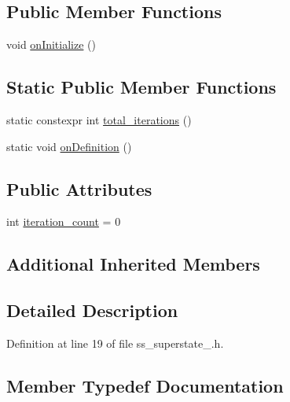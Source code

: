 \subsection*{Public Member Functions}
\begin{DoxyCompactItemize}
\item 
void \hyperlink{structsm__three__some_1_1SS1_1_1Ss1_a5fa4f5f30156372352630a619fac4778}{on\+Initialize} ()
\end{DoxyCompactItemize}
\subsection*{Static Public Member Functions}
\begin{DoxyCompactItemize}
\item 
static constexpr int \hyperlink{structsm__three__some_1_1SS1_1_1Ss1_a02f44c29d4ebf2615b66a0783ee668e4}{total\+\_\+iterations} ()
\item 
static void \hyperlink{structsm__three__some_1_1SS1_1_1Ss1_aeac7f375b7b0d430f4abf802cef0c87a}{on\+Definition} ()
\end{DoxyCompactItemize}
\subsection*{Public Attributes}
\begin{DoxyCompactItemize}
\item 
int \hyperlink{structsm__three__some_1_1SS1_1_1Ss1_a775d2050e53513d711b041238b5c11ff}{iteration\+\_\+count} = 0
\end{DoxyCompactItemize}
\subsection*{Additional Inherited Members}


\subsection{Detailed Description}


Definition at line 19 of file ss\+\_\+superstate\+\_.\+h.



\subsection{Member Typedef Documentation}
